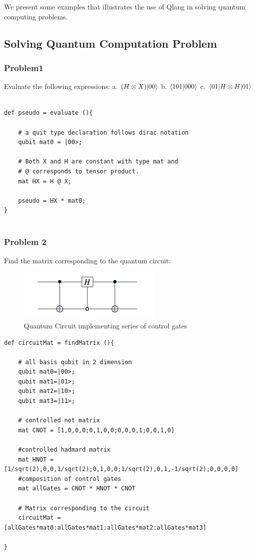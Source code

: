 We present some examples that illustrates the use of Qlang in solving quantum computing problems.

\subsection { Solving Quantum Computation Problem}
\subsubsection{Problem1}
Evaluate the following expressions: a. $(H \otimes X) |00\rangle$ b. $\dotproduct[101,000]$ c. $\langle 01| H \otimes H |01\rangle $
\begin{lstlisting}
	
def pseudo = evaluate (){
		
	# a quit type declaration follows dirac notation
	qubit mat0 = |00>;
		
	# Both X and H are constant with type mat and
	# @ corresponds to tensor product.
	mat HX = H @ X;
		
	pseudo = HX * mat0;
}
	
\end{lstlisting}

\subsubsection{Problem 2}
Find the matrix corresponding to the quantum circuit:
\begin{figure}[h!]
\begin{center}
\includegraphics{circuit1}
\end{center}
\caption{ Quantum Circuit implementing series of control gates
\label{cir1}}
\end{figure}

\begin{lstlisting}
def circuitMat = findMatrix (){
	
	# all basis qubit in 2 dimension
	qubit mat0=|00>;
	qubit mat1=|01>;
	qubit mat2=|10>;
	qubit mat3=|11>;
	
	# controlled not matrix	
	mat CNOT = [1,0,0,0;0,1,0,0;0,0,0,1;0,0,1,0]
	
	#controlled hadmard matrix
	mat HNOT = [1/sqrt(2),0,0,1/sqrt(2);0,1,0,0;1/sqrt(2),0,1,-1/sqrt(2);0,0,0,0]
	#composition of control gates
	mat allGates = CNOT * HNOT * CNOT
	
	# Matrix corresponding to the circuit	
	circuitMat =[allGates*mat0:allGates*mat1:allGates*mat2:allGates*mat3]
		
}
\end{lstlisting}
